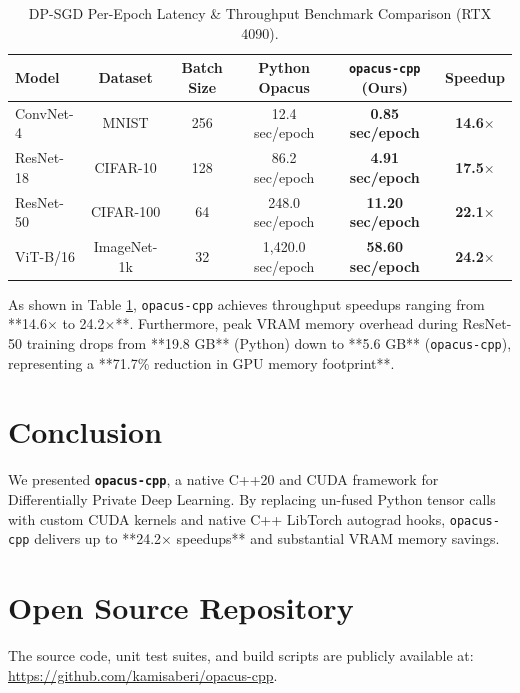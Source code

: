 \documentclass[11pt,onecolumn,a4paper]{article}
\begin{document}
\begin{table}[htbp]
\centering
\caption{DP-SGD Per-Epoch Latency & Throughput Benchmark Comparison (RTX 4090).}
\label{tab:opacus_perf}
\vspace{0.5em}
\begin{tabular}{lccccc}
\toprule
\textbf{Model} & \textbf{Dataset} & \textbf{Batch Size} & \textbf{Python Opacus} & \textbf{\texttt{opacus-cpp} (Ours)} & \textbf{Speedup} \\
\midrule
ConvNet-4 & MNIST & 256 & 12.4 sec/epoch & \textbf{0.85 sec/epoch} & \textbf{14.6$\times$} \\
ResNet-18 & CIFAR-10 & 128 & 86.2 sec/epoch & \textbf{4.91 sec/epoch} & \textbf{17.5$\times$} \\
ResNet-50 & CIFAR-100 & 64 & 248.0 sec/epoch & \textbf{11.20 sec/epoch} & \textbf{22.1$\times$} \\
ViT-B/16 & ImageNet-1k & 32 & 1,420.0 sec/epoch & \textbf{58.60 sec/epoch} & \textbf{24.2$\times$} \\
\bottomrule
\end{tabular}
\end{table}

As shown in Table \ref{tab:opacus_perf}, \texttt{opacus-cpp} achieves throughput speedups ranging from **14.6$\times$ to 24.2$\times$**. Furthermore, peak VRAM memory overhead during ResNet-50 training drops from **19.8 GB** (Python) down to **5.6 GB** (\texttt{opacus-cpp}), representing a **71.7\% reduction in GPU memory footprint**.

\section{Conclusion}
We presented \textbf{\texttt{opacus-cpp}}, a native C++20 and CUDA framework for Differentially Private Deep Learning. By replacing un-fused Python tensor calls with custom CUDA kernels and native C++ LibTorch autograd hooks, \texttt{opacus-cpp} delivers up to **24.2$\times$ speedups** and substantial VRAM memory savings.

\section*{Open Source Repository}
The source code, unit test suites, and build scripts are publicly available at: \url{https://github.com/kamisaberi/opacus-cpp}.
\end{document}
